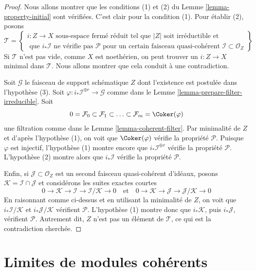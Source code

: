 \begin{proof}
Nous allons montrer que les conditions (1) et (2) du
Lemme \ref{lemma-property-initial} sont vérifiées. C'est clair pour la condition (1).
Pour établir (2), posons
$$
\mathcal{T} =
\left\{
\begin{matrix}
i : Z \to X \text{ sous-espace fermé réduit tel que }|Z|\text{ soit irréductible et}\\
\text{ que }i_*\mathcal{I}\text{ ne vérifie pas }\mathcal{P}
\text{ pour un certain faisceau quasi-cohérent }\mathcal{I} \subset \mathcal{O}_Z
\end{matrix}
\right\}
$$
Si $\mathcal{T}$ n'est pas vide, comme $X$ est noethérien, on peut
trouver un $i : Z \to X$ minimal dans $\mathcal{T}$. Nous allons montrer
que cela conduit à une contradiction.

\medskip\noindent
Soit $\mathcal{G}$ le faisceau de support schématique $Z$ dont
l'existence est postulée dans l'hypothèse (3). Soit
$\varphi : i_*\mathcal{I}^{\oplus r} \to \mathcal{G}$ comme dans le
Lemme \ref{lemma-prepare-filter-irreducible}. Soit
$$
0 = \mathcal{F}_0 \subset \mathcal{F}_1 \subset
\ldots \subset \mathcal{F}_m = \Coker(\varphi)
$$
une filtration comme dans le Lemme \ref{lemma-coherent-filter}. Par minimalité
de $Z$ et d'après l'hypothèse (1), on voit que $\Coker(\varphi)$ vérifie
la propriété $\mathcal{P}$. Puisque $\varphi$ est injectif, l'hypothèse (1)
montre encore que $i_*\mathcal{I}^{\oplus r}$ vérifie la propriété
$\mathcal{P}$. L'hypothèse (2) montre alors que $i_*\mathcal{I}$
vérifie la propriété $\mathcal{P}$.

\medskip\noindent
Enfin, si $\mathcal{J} \subset \mathcal{O}_Z$ est un second faisceau quasi-cohérent
d'idéaux, posons $\mathcal{K} = \mathcal{I} \cap \mathcal{J}$
et considérons les suites exactes courtes
$$
0 \to \mathcal{K} \to \mathcal{I} \to \mathcal{I}/\mathcal{K} \to 0
\quad
\text{et}
\quad
0 \to \mathcal{K} \to \mathcal{J} \to \mathcal{J}/\mathcal{K} \to 0
$$
En raisonnant comme ci-dessus et en utilisant la minimalité de $Z$, on voit que
$i_*\mathcal{I}/\mathcal{K}$ et $i_*\mathcal{J}/\mathcal{K}$
vérifient $\mathcal{P}$. L'hypothèse (1) montre donc que
$i_*\mathcal{K}$, puis $i_*\mathcal{J}$, vérifient $\mathcal{P}$.
Autrement dit, $Z$ n'est pas un élément de $\mathcal{T}$, ce qui est
la contradiction cherchée.
\end{proof}






\section{Limites de modules cohérents}
\label{section-limits}

